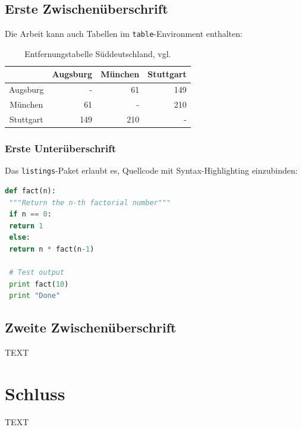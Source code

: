  \section{Erste Zwischen\"{u}berschrift}
 \label{sec:ErsteZwischenueberschrift}
 Die Arbeit kann auch Tabellen im \texttt{table}-Environment enthalten:
 \begin{table}[ht]
 	\centering
 	\caption{Entfernungstabelle S\"{u}ddeutschland, vgl. \cite{entfernungstabelle}}
 	\begin{tabular}{c r r r}
 		\toprule
 		& Augsburg & M\"{u}nchen & Stuttgart \\
 		\midrule
 		Augsburg  & -        & 61      & 149       \\
 		M\"{u}nchen   & 61       & -       & 210       \\
 		Stuttgart & 149      & 210     & -         \\
 		\bottomrule
 	\end{tabular}
 	\label{tab:entfernungen}
 \end{table}
 
 \subsection{Erste Unter\"{u}berschrift}
 \label{sec:ErsteUnterueberschrift}
 
 Das \texttt{listings}-Paket erlaubt es, Quellcode mit Syntax-Highlighting einzubinden:
 
 \begin{lstlisting}[language=Python,float=ht,caption={Python-Programm zur Berechnung der Fakult\"{a}tsfunktion}]
 def fact(n):
 """Return the n-th factorial number"""
 if n == 0:
 return 1
 else:
 return n * fact(n-1)
 
 # Test output
 print fact(10)
 print "Done"
 \end{lstlisting}
 \label{lst:factorial}  
 
 \section{Zweite Zwischen\"{u}berschrift}
 \label{sec:ZweiteZwischenueberschrift}
 
 TEXT
 
 \chapter{Schluss}
 \label{chp:Schluss}
 
 TEXT
 
 
